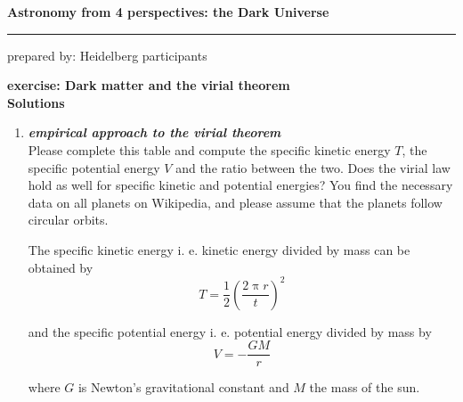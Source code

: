 \documentclass[a4paper,12pt]{article}
\newcommand{\question}[1]{\textbf{\textit{#1}}}
\newcommand{\HRule}{\rule{\linewidth}{0.3mm}}
\renewcommand{\pi}{\uppi}
\begin{document}
	\pagestyle{empty}
	
	\begin{center}
		\LARGE \textbf{Astronomy from 4 perspectives: the Dark Universe}
		\HRule
	\end{center}
	\begin{flushright}
		prepared by: Heidelberg participants
	\end{flushright}
	\begin{center}
		{\Large \textbf{exercise: Dark matter and the virial theorem}}\\
		\vspace*{2mm}
		{\Large \textbf{Solutions}}
		
	\end{center}
	\vspace{5mm}
	
	\begin{enumerate}
		
		\item \question{empirical approach to the virial theorem}\\
		Please complete this table and compute the specific kinetic energy $T$, the specific potential energy $V$ and the ratio between the two. Does the virial law hold as well for specific kinetic and potential energies? You find the necessary data on all planets on Wikipedia, and please assume that the planets follow circular orbits.
		
		The specific kinetic energy i. e. kinetic energy divided by mass can be obtained by
		\begin{equation}
		T = \frac{1}{2}\left(\frac{2\pi r}{t}\right)^{2}
		\end{equation}
		
		and the specific potential energy i. e. potential energy divided by mass by
		\begin{equation}
		V = -\frac{GM}{r}
		\end{equation}
		
		where $G$ is Newton's gravitational constant and $M$ the mass of the sun.
		

\end{enumerate}
\end{document}
